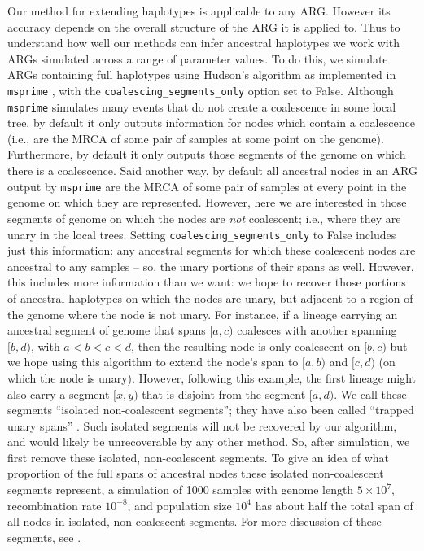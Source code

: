 \documentclass[10pt,twoside,lineno]{gsajnl}
\newcommand{\msprime}{\texttt{msprime}}
\begin{document}
Our method for extending haplotypes is applicable to any ARG.
However its accuracy depends on the overall structure of the ARG it is applied to. 
Thus to understand how well our methods can infer ancestral haplotypes we 
work with ARGs simulated across a range of parameter values.
To do this, we simulate ARGs containing full haplotypes using 
Hudson's algorithm as implemented in \msprime{} 
\citep{kelleher2016efficient,baumdicker2021efficient},
with the \texttt{coalescing\_segments\_only} option set to False.
Although \msprime{} simulates many events that do not create a coalescence in some local tree,
by default it only outputs information for nodes which contain a coalescence
(i.e., are the MRCA of some pair of samples at some point on the genome).
Furthermore, by default it only outputs those segments of the genome
on which there is a coalescence.
Said another way, by default all ancestral nodes in an ARG
output by \msprime{} are the MRCA of some pair of samples at every point in the genome
on which they are represented.
However, here we are interested in those segments of genome
on which the nodes are \emph{not} coalescent;
i.e., where they are unary in the local trees.
Setting \texttt{coalescing\_segments\_only} to False includes just this information:
any ancestral segments for which these coalescent nodes
are ancestral to any samples -- so, the unary portions of their spans as well.
However, this includes more information than we want:
we hope to recover those portions of ancestral haplotypes
on which the nodes are unary, but adjacent to a region of the genome where the node is not unary.
For instance, if a lineage carrying an ancestral segment of genome that spans $[a, c)$
coalesces with another spanning $[b, d)$, with $a < b < c < d$,
then the resulting node is only coalescent on $[b, c)$ but we hope using this algorithm
to extend the node's span to $[a, b)$ and $[c, d)$
(on which the node is unary).
However, following this example, the first lineage might also carry a segment $[x, y)$
that is disjoint from the segment $[a, d)$.
We call these segments ``isolated non-coalescent segments'';
they have also been called ``trapped unary spans'' \citep[by][]{wong2024general}.
Such isolated segments will not be recovered by our algorithm,
and would likely be unrecoverable by any other method.
So, after simulation, we first remove these isolated, non-coalescent segments.
To give an idea of what proportion of the full spans of ancestral nodes
these isolated non-coalescent segments represent,
a simulation of 1000 samples
with genome length $5\times 10^7$, recombination rate $10^{-8}$, and population size $10^4$
has about half the total span of all nodes in isolated, non-coalescent segments.
For more discussion of these segments, see \citet{baumdicker2021efficient}.
\end{document}
